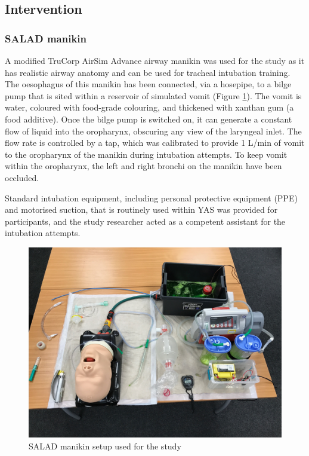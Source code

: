 \documentclass[]{article}
\begin{document}
\hypertarget{intervention}{%
\subsection{Intervention}\label{intervention}}

\hypertarget{salad-manikin}{%
\subsubsection{SALAD manikin}\label{salad-manikin}}

A modified TruCorp AirSim Advance airway manikin was used for the study
as it has realistic airway anatomy and can be used for tracheal
intubation training. The oesophagus of this manikin has been connected,
via a hosepipe, to a bilge pump that is sited within a reservoir of
simulated vomit (Figure \ref{fig:figure1}). The vomit is water, coloured
with food-grade colouring, and thickened with xanthan gum (a food
additive). Once the bilge pump is switched on, it can generate a
constant flow of liquid into the oropharynx, obscuring any view of the
laryngeal inlet. The flow rate is controlled by a tap, which was
calibrated to provide 1 L/min of vomit to the oropharynx of the manikin
during intubation attempts. To keep vomit within the oropharynx, the
left and right bronchi on the manikin have been occluded.

Standard intubation equipment, including personal protective equipment
(PPE) and motorised suction, that is routinely used within YAS was
provided for participants, and the study researcher acted as a competent
assistant for the intubation attempts.

\begin{figure}
\includegraphics[width=7in]{images/figure-1} \caption{SALAD manikin setup used for the study}\label{fig:figure1}
\end{figure}
\end{document}
